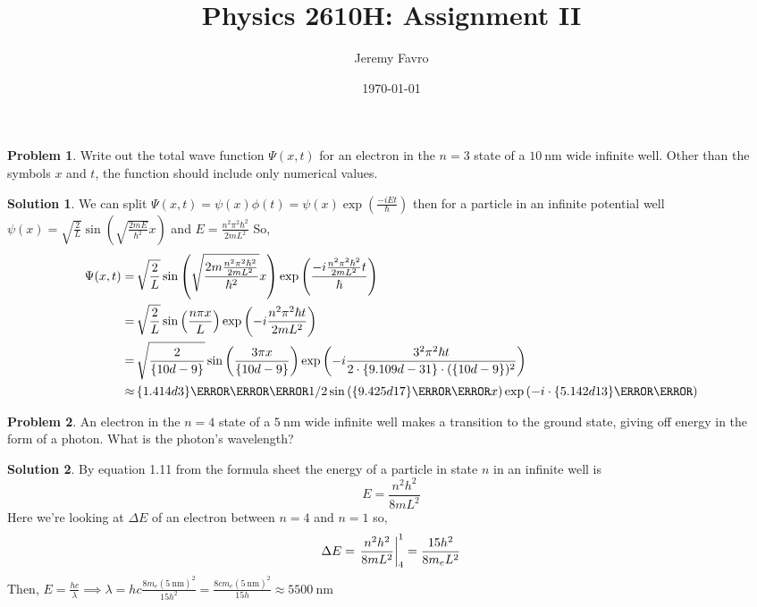 \documentclass[10pt]{article}
\title{Physics 2610H: Assignment II}
\author{Jeremy Favro}
\date{\today}
\theoremstyle{definition}
\newtheorem{problem}{Problem}
\newtheorem{soln}{Solution}
\begin{document}
\maketitle

\begin{problem}
Write out the total wave function $\Psi(x, t)$ for an electron in the $n=3$ state of a $\qty{10}{\nano\meter}$ wide infinite well.
Other than the symbols $x$ and $t$, the function should include only numerical values.
\end{problem}
\begin{soln}
  We can split $\Psi(x, t)=\psi(x)\phi(t)=\psi(x)\exp\left(\frac{-iEt}{\hbar}\right)$ then for a particle in an infinite potential well
  $\psi(x)=\sqrt{\frac{2}{L}}\sin\left(\sqrt{\frac{2mE}{\hbar^2}}x\right)$ and $E=\frac{n^2\pi^2\hbar^2}{2mL^2}$ So,
  \begin{align*}
    \Psi(x, t) = &\,\sqrt{\frac{2}{L}}\sin\left(\sqrt{\frac{2m\frac{n^2\pi^2\hbar^2}{2mL^2}}{\hbar^2}}x\right)\exp\left(\frac{-i\frac{n^2\pi^2\hbar^2}{2mL^2}t}{\hbar}\right)\\
     = &\,\sqrt{\frac{2}{L}}\sin\left(\frac{n\pi x}{L}\right)\exp\left(-i\frac{n^2\pi^2\hbar t}{2mL^2}\right)\\
     = &\,\sqrt{\frac{2}{\qty{10d-9}{}}}\sin\left(\frac{3\pi x}{\qty{10d-9}{}}\right)\exp\left(-i\frac{3^2\pi^2\hbar t}{2\cdot\qty{9.109d-31}{}\cdot(\qty{10d-9})^2}\right)\\
     \approx &\,\qty{1.414d3}{\per\meter\tothe{1/2}}\sin\left(\qty{9.425d17}{\per\meter}x\right)\exp\left(-i\cdot \qty{5.142d13}{\per\second}\right)\\
  \end{align*}
\end{soln}

\begin{problem}
An electron in the $n=4$ state of a $\qty{5}{\nano\meter}$ wide infinite well makes a transition to the ground state,
giving off energy in the form of a photon. What is the photon's wavelength?
\end{problem}
\begin{soln} By equation 1.11 from the formula sheet the energy of a particle in state $n$ in an infinite well is
  $$E=\frac{n^2h^2}{8mL^2}$$
  Here we're looking at $\Delta E$ of an electron between $n=4$ and $n=1$ so,
  $$\Delta E = \eval{\frac{n^2h^2}{8mL^2}}_{4}^{1}=\frac{15h^2}{8m_eL^2}$$
  Then, $\displaystyle E=\frac{hc}{\lambda}\implies \lambda = hc\frac{8m_e(\qty{5}{\nano\meter})^2}{15h^2}=\frac{8cm_e(\qty{5}{\nano\meter})^2}{15h}\approx \qty{5500}{\nano\meter}$
\end{soln}
\end{document}
